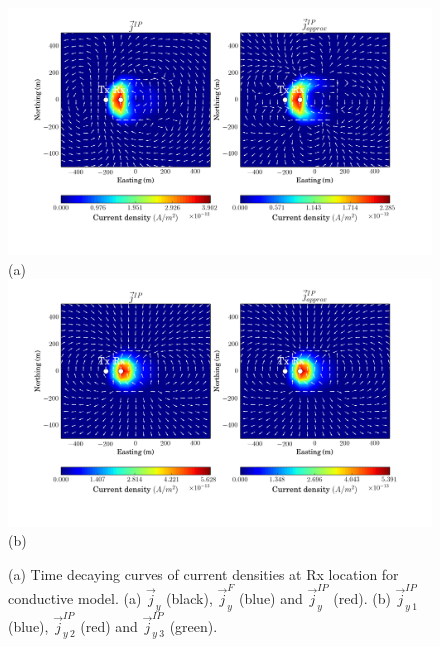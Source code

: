 \documentclass[a4paper, 11pt]{article}
\renewcommand {\j}  { {\vec j} }
\begin{document}
\begin{figure}[htb]
  \centering
  \includegraphics[height=0.4\textheight]{figures/synthetic/CurrentIP_case2_ch20.png} \\
  (a) \\
  \includegraphics[height=0.4\textheight]{figures/synthetic/CurrentIP_case2_ch38.png} \\
  (b)
  \caption{(a) Time decaying curves of current densities at Rx location for conductive model. (a) $\j_y$ (black), $\j^F_y$ (blue) and $\j^{IP}_y$ (red). (b) $\j^{IP}_{y \ 1}$ (blue), $\j^{IP}_{y \ 2}$ (red) and $\j^{IP}_{y \ 3}$ (green).}
  \label{F: currentIP_case2_plan}
\end{figure}
\end{document}
